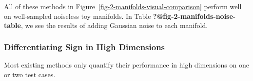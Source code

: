 \documentclass[
  letterpaper,
  DIV=11,
  numbers=noendperiod]{scrartcl}
\theoremstyle{plain}
\theoremstyle{plain}
\theoremstyle{definition}
\theoremstyle{plain}
\theoremstyle{definition}
\theoremstyle{plain}
\theoremstyle{remark}
\begin{document}
All of these methods in Figure~\ref{fig-2-manifolds-visual-comparison}
perform well on well-sampled noiseless toy manifolds. In Table
\textbf{?@fig-2-manifolds-noise-table}, we see the results of adding
Gaussian noise to each manifold.

\subsubsection{Differentiating Sign in High
Dimensions}\label{differentiating-sign-in-high-dimensions}

Most existing methods only quantify their performance in high dimensions
on one or two test cases.

\begin{figure}[H]

\end{figure}
\end{document}
